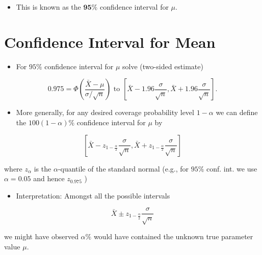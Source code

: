 \documentclass[10pt]{article}
\begin{document}
\begin{itemize}
  \item This is known as the $\mathbf{9 5 \%}$ confidence interval for $\mu$.
\end{itemize}

\section*{Confidence Interval for Mean}
\begin{itemize}
  \item For $95 \%$ confidence interval for $\mu$ solve (two-sided estimate)
\end{itemize}

$$
0.975=\Phi\left(\frac{\bar{X}-\mu}{\sigma / \sqrt{n}}\right) \text { to }\left[\bar{X}-1.96 \frac{\sigma}{\sqrt{n}}, \bar{X}+1.96 \frac{\sigma}{\sqrt{n}}\right] .
$$

\begin{itemize}
  \item More generally, for any desired coverage probability level $1-\alpha$ we can define the $100(1-\alpha) \%$ confidence interval for $\mu$ by
\end{itemize}

$$
\left[\bar{X}-z_{1-\frac{\alpha}{2}} \frac{\sigma}{\sqrt{n}}, \bar{X}+z_{1-\frac{\alpha}{2}} \frac{\sigma}{\sqrt{n}}\right]
$$

where $z_{\alpha}$ is the $\alpha$-quantile of the standard normal (e.g., for $95 \%$ conf. int. we use $\alpha=0.05$ and hence $z_{0.975}$ )

\begin{itemize}
  \item Interpretation: Amongst all the possible intervals
\end{itemize}

$$
\bar{X} \pm z_{1-\frac{\alpha}{2}} \frac{\sigma}{\sqrt{n}}
$$

we might have observed $\alpha \%$ would have contained the unknown true parameter value $\mu$.
\end{document}

